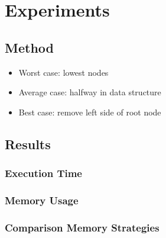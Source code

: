 \chapter{Experiments}

\section{Method}

\begin{itemize}
  \item Worst case:   lowest nodes
  \item Average case: halfway in data structure
  \item Best case:    remove left side of root node
\end{itemize}

\section{Results}

\subsection{Execution Time}


\subsection{Memory Usage}


\subsection{Comparison Memory Strategies}